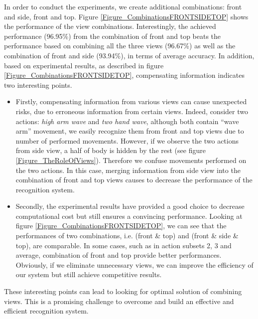 \documentclass[final,3p,times,twocolumn]{elsarticle}
\begin{document}
In order to conduct the experiments, we create additional combinations: front and side, front and top.
Figure \ref{Figure_CombinationsFRONTSIDETOP} shows the performance of the view combinations.
Interestingly, the achieved performance (96.95\%) from the combination of front and top beats the performance based on combining all the three views (96.67\%) as well as the combination of front and side (93.94\%), in terms of average accuracy.
In addition, based on experimental results, as described in figure \ref{Figure_CombinationsFRONTSIDETOP}, compensating information indicates two interesting points.

\begin{itemize}
	\item Firstly, compensating information from various views can cause unexpected risks, due to erroneous information from certain views.
	Indeed, consider two actions: \textit{high arm wave} and \textit{two hand wave}, although both contain ``wave arm'' movement, we easily recognize them from front and top views due to number of performed movements.
	However, if we observe the two actions from side view, a half of body is hidden by the rest (see figure \ref{Figure_TheRoleOfViews}).
	Therefore we confuse movements performed on the two actions.
	In this case, merging information from side view into the combination of front and top views causes to decrease the performance of the recognition system.
	
	\item Secondly, the experimental results have provided a good choice to decrease computational cost but still ensures a convincing performance.
	Looking at figure \ref{Figure_CombinationsFRONTSIDETOP}, we can see that the performances of two combinations, i.e. (front \& top) and (front \& side \& top), are comparable.
	In some cases, such as in action subsets 2, 3 and average, combination of front and top provide better performances.
	Obviously, if we eliminate unnecessary views, we can improve the efficiency of our system but still achieve competitive results.
\end{itemize}

These interesting points can lead to looking for optimal solution of combining views.
This is a promising challenge to overcome and build an effective and efficient recognition system.
\end{document}

